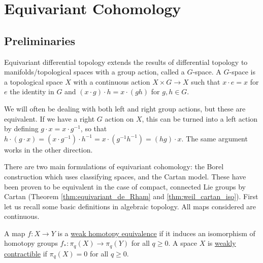 \chapter{Equivariant Cohomology}
\label{chapter_equivariant}

\section{Preliminaries}
Equivariant differential topology extends the results of differential topology
to manifolds/topological spaces with a group action, called a $G$-space. A
$G$-space is a topological space $X$ with a continuous action $X\times G \to X$ 
such that $x\cdot e = x$ for $e$ the identity in  $G$ and $(x\cdot g) \cdot h =
x\cdot (gh)$ for $g,h\in G$. 

We will often be dealing with both left and right group actions, but these are
equivalent. If we have a right $G$ action on $X$, this can be turned into a left
action by defining  $g \cdot x = x \cdot g^{-1}$, so that $h\cdot (g\cdot x) =
(x\cdot g^{-1})\cdot h^{-1} = x\cdot (g^{-1}h^{-1}) = (hg)\cdot x$. The same
argument works in the other direction.


There are two main formulations of equivariant
cohomology: the Borel construction which uses classifying spaces, and the Cartan model.
These have been proven to be equivalent in the case of compact, connected Lie groups 
by Cartan (Theorem \ref{thm:equivariant_de_Rham} and \ref{thm:weil_cartan_iso}). 
First let us recall some basic definitions in algebraic topology. All maps
considered are continuous.
\begin{defn}
	\begin{comment} %
	Let $(X,x_0)$ and $(Y,y_0)$ be based topological spaces. Two maps
	$f,g:(X,x_0)\to(Y,y_0)$ are \underline{homotopic} if there is a continuous
	map $F:X\times [0,1]\to Y$ such that
	$F(x,0)=f(x),F(x,1)=g(x),F(x_0,t)=y_0$. Then we denote $f\sim g$.

	A \underline{homotopy equivalence} is a continuous map $f:(X,x_0)\to(Y,y_0)$
	that has a homotopy inverse, i.e. a continuous map $g:(Y,y_0)\to(X,x_0)$
	such that $f\circ g \sim 1_Y$ and $g\circ f \sim 1_X$.
	Then we say $X$ and  $Y$ have the same homotopy type.

	If $X$ has the homotopy type of a point, we call it
	\underline{contractible}.
	\end{comment}

	A map $f:X\to Y$ is a \underline{weak homotopy equivalence} if
	it induces an isomorphism of homotopy groups
	$f_*:\pi_q(X)\to\pi_q(Y)$ for all  $q\geq 0$. 
	A space $X$ is \underline{weakly contractible} if $\pi_q(X)=0$ for all  $q\geq 0$. 
\end{defn}

